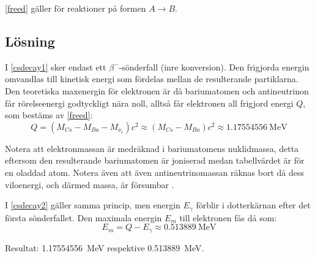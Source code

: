 \eqref{freed} gäller för reaktioner på formen $A \longrightarrow B$.

\subsection*{Lösning}

I \eqref{csdecay1} sker endast ett $\beta^-$-sönderfall (inre konversion). Den
frigjorda energin omvandlas till kinetisk energi som fördelas mellan de
resulterande partiklarna. Den teoretiska maxenergin för elektronen är då
bariumatomen och antineutrinon får rörelseenergi godtyckligt nära noll, alltså
får elektronen all frigjord energi $Q$, som bestäms av \eqref{freed}:
%
\begin{equation}
    Q = (M_{Cs} - M_{Ba} - M_{\bar{\nu}_e})c^2 \approx (M_{Cs} - M_{Ba})c^2 \approx \qty{1.17554556}{\MeV}
\end{equation}

Notera att elektronmassan är medräknad i bariumatomens nuklidmassa, detta
eftersom den resulterande bariumatomen är joniserad medan tabellvärdet är
för en oladdad atom. Notera även att även antineutrinomassan räknas bort då
dess viloenergi, och därmed massa, är försumbar .

I \eqref{csdecay2} gäller samma princip, men energin $E_\gamma$ förblir i
dotterkärnan efter det första sönderfallet. Den maximala energin $E_m$ till
elektronen fås då som:
%
\begin{equation}
    E_m = Q - E_\gamma \approx \qty{0.513889}{\MeV}
\end{equation}

Resultat: \qty{1.17554556}{\MeV} respektive \qty{0.513889}{\MeV}.
